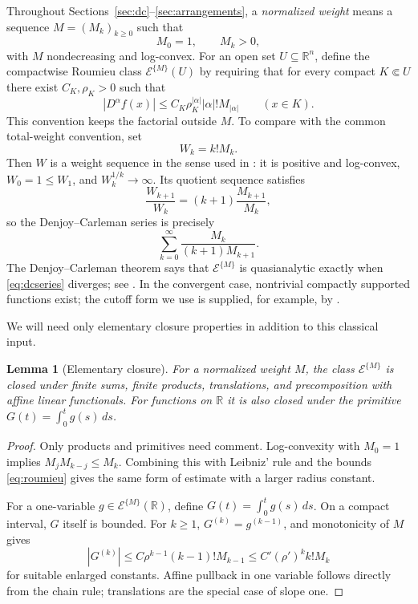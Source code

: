 \documentclass[11pt]{article}
\newtheorem{lemma}[theorem]{Lemma}
\theoremstyle{definition}
\theoremstyle{remark}
\newcommand{\R}{\mathbb{R}}
\begin{document}
Throughout Sections~\ref{sec:dc}--\ref{sec:arrangements}, a \emph{normalized weight} means a sequence $M=(M_k)_{k\ge0}$ such that
\[
 M_0=1,
 \qquad M_k>0,
\]
with $M$ nondecreasing and log-convex. For an open set $U\subseteq\R^n$, define the compactwise Roumieu class $\mathcal{E}^{\{M\}}(U)$ by requiring that for every compact $K\Subset U$ there exist $C_K,\rho_K>0$ such that
\begin{equation}\label{eq:roumieu}
 |D^\alpha f(x)|
 \le C_K\rho_K^{|\alpha|}|\alpha|!M_{|\alpha|}
 \qquad (x\in K).
\end{equation}
This convention keeps the factorial outside $M$. To compare with the common total-weight convention, set
\[
 W_k=k!M_k.
\]
Then $W$ is a weight sequence in the sense used in \cite{Rainer2022}: it is positive and log-convex, $W_0=1\le W_1$, and $W_k^{1/k}\to\infty$. Its quotient sequence satisfies
\[
 \frac{W_{k+1}}{W_k}
 =(k+1)\frac{M_{k+1}}{M_k},
\]
so the Denjoy--Carleman series is precisely
\begin{equation}\label{eq:dcseries}
 \sum_{k=0}^{\infty}\frac{M_k}{(k+1)M_{k+1}}.
\end{equation}
The Denjoy--Carleman theorem says that $\mathcal{E}^{\{M\}}$ is quasianalytic exactly when \eqref{eq:dcseries} diverges; see \cite[Theorem~3.6]{Rainer2022}. In the convergent case, nontrivial compactly supported functions exist; the cutoff form we use is supplied, for example, by \cite[Corollary~3.12]{Rainer2022}.

We will need only elementary closure properties in addition to this classical input.

\begin{lemma}[Elementary closure]\label{lem:closure}
For a normalized weight $M$, the class $\mathcal{E}^{\{M\}}$ is closed under finite sums, finite products, translations, and precomposition with affine linear functionals. For functions on $\R$ it is also closed under the primitive $G(t)=\int_0^t g(s)\,ds$.
\end{lemma}

\begin{proof}
Only products and primitives need comment. Log-convexity with $M_0=1$ implies $M_jM_{k-j}\le M_k$. Combining this with Leibniz' rule and the bounds \eqref{eq:roumieu} gives the same form of estimate with a larger radius constant.

For a one-variable $g\in\mathcal{E}^{\{M\}}(\R)$, define $G(t)=\int_0^t g(s)\,ds$. On a compact interval, $G$ itself is bounded. For $k\ge1$, $G^{(k)}=g^{(k-1)}$, and monotonicity of $M$ gives
\[
 |G^{(k)}|
 \le C\rho^{k-1}(k-1)!M_{k-1}
 \le C'({\rho}')^k k!M_k
\]
for suitable enlarged constants. Affine pullback in one variable follows directly from the chain rule; translations are the special case of slope one.
\end{proof}
\end{document}
